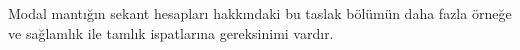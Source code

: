 

\begin{editorial}
  Modal mantığın sekant hesapları hakkındaki bu taslak bölümün daha fazla
  örneğe ve sağlamlık ile tamlık ispatlarına gereksinimi vardır.
\end{editorial}


\OLEndChapterHook

